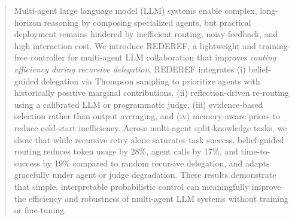 \begin{abstract}
Multi-agent large language model (LLM) systems enable complex, long-horizon reasoning by composing specialized agents, but practical deployment remains hindered by inefficient routing, noisy feedback,
and high interaction cost. We introduce \textsc{REDEREF}, a lightweight and training-free controller
for multi-agent LLM collaboration that improves \emph{routing efficiency during recursive delegation}.
\textsc{REDEREF} integrates (i) belief-guided delegation via Thompson sampling to prioritize agents
with historically positive marginal contributions, (ii) reflection-driven re-routing using a calibrated
LLM or programmatic judge, (iii) evidence-based selection rather than output averaging, and
(iv) memory-aware priors to reduce cold-start inefficiency.
Across multi-agent split-knowledge tasks, we show that while recursive retry alone saturates task
success, belief-guided routing reduces token usage by 28\%, agent calls by 17\%, and time-to-success by 19\% compared to random recursive delegation,
and adapts gracefully under agent or judge degradation. These results demonstrate that simple,
interpretable probabilistic control can meaningfully improve the efficiency and robustness of multi-agent LLM systems without training or fine-tuning.
\end{abstract}
